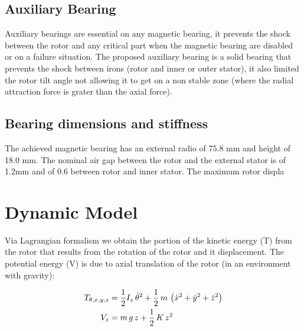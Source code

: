\documentclass[10pt,fleqn,a4paper,twoside]{article}
\begin{document}
	\subsection{Auxiliary Bearing}
	
	Auxiliary bearings are essential on any magnetic bearing, it prevents the shock between the rotor and any critical part when the magnetic bearing are disabled or on a failure situation. The proposed auxiliary bearing is a solid bearing that prevents the shock between irons (rotor and inner or outer stator), it also limited the rotor tilt angle not allowing it to get on a non stable zone (where the radial attraction force is grater than the axial force). 
	
	
	
	\subsection{Bearing dimensions and stiffness}
	
	The achieved magnetic bearing has an external radio of 75.8 mm and height of 18.0 mm. The nominal air gap between the rotor and the external stator is of 1.2mm and of 0.6 between rotor and inner stator. The maximum rotor displa
	
	\section{Dynamic Model}
	
	Via Lagrangian formalism we obtain the portion of the kinetic energy (T) from the rotor that results from the rotation of the rotor and it displacement. The potential energy (V) is due to axial translation of the rotor (in an environment with gravity): 
	
	\begin{align}
		T_{\theta, x, y, z} &= \frac{1}{2} I_z \, \dot{\theta}^2 + \frac{1}{2} \, m \, \left( \dot{x}^2 + \dot{y}^2 + \dot{z}^2 \right) \notag \\
		V_z &= m \, g \, z + \frac{1}{2} \, K \, z^2
	\end{align}
	
\end{document}
